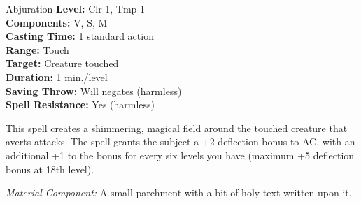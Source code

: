 {Abjuration}
{
	\textbf{Level:}
	Clr 1, Tmp 1\\
	\textbf{Components:}
	V, S, M\\
	\textbf{Casting Time:}
	1 standard action\\
	\textbf{Range:}
	Touch\\
	\textbf{Target:}
	Creature touched\\
	\textbf{Duration:}
	1 min./level\\
	\textbf{Saving Throw:}
	Will negates (harmless)\\
	\textbf{Spell Resistance:}
	Yes (harmless)\\
}
{
	This spell creates a shimmering, magical field around the touched creature that averts attacks. The spell grants the subject a +2 deflection bonus to AC, with an additional +1 to the bonus for every six levels you have (maximum +5 deflection bonus at 18th level).

	\textit{Material Component:}
	A small parchment with a bit of holy text written upon it.

}
